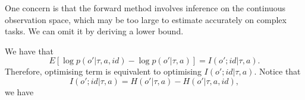 One concern is that the forward method involves inference on the continuous observation space, which may be too large to estimate accurately on complex tasks. We can omit it by deriving a lower bound.

We have that
\begin{equation}
E[\log p(o' | \tau, a, id) - \log p(o' | \tau, a)] = I(o'; id | \tau, a).
\end{equation}
Therefore, optimising term  is equivalent to optimising $I(o'; id | \tau, a)$. Notice that
\begin{equation}
    I(o'; id | \tau, a) = H(o' | \tau, a) - H(o' | \tau, a, id), 
\end{equation}
we have 
